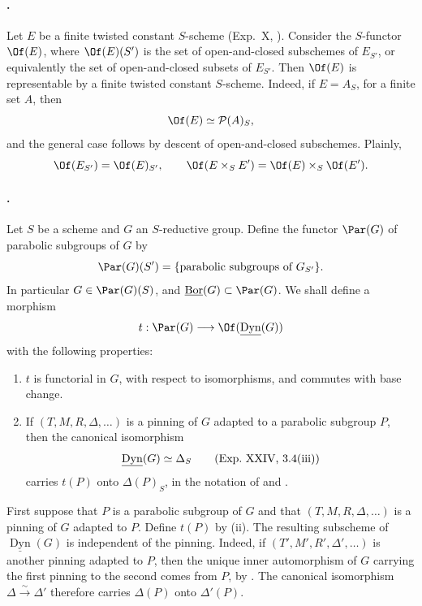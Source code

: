 
\paragraph{.}
Let \(E\) be a finite twisted constant \(S\)-scheme (Exp.\ X, ).
Consider the \(S\)-functor \(\Of(E)\), where \(\Of(E)(S')\) is the set of
open-and-closed subschemes of \(E_{S'}\), or equivalently the set of
open-and-closed subsets of \(E_{S'}\).  Then \(\Of(E)\) is representable
by a finite twisted constant \(S\)-scheme.  Indeed, if \(E=A_S\), for a
finite set \(A\), then
\[
 \Of(E)\simeq\mathcal P(A)_S,
\]
and the general case follows by descent of open-and-closed subschemes.  Plainly,
\[
 \Of(E_{S'})=\Of(E)_{S'},
 \qquad
 \Of(E\times_SE')=\Of(E)\times_S\Of(E').
\]

\paragraph{.}
Let \(S\) be a scheme and \(G\) an \(S\)-reductive group.  Define the
functor \(\Par(G)\) of parabolic subgroups of \(G\) by
\[
 \Par(G)(S')
 =\{\text{parabolic subgroups of }G_{S'}\}.
\]
In particular \(G\in\Par(G)(S)\), and
\(\underline{\operatorname{Bor}}(G)\subset\Par(G)\).  We shall define a
morphism
\[
 t:\Par(G)\longrightarrow\Of(\underline{\operatorname{Dyn}}(G))
\]
with the following properties:
\begin{enumerate}[label=\textup{(\roman*)}]
\item \(t\) is functorial in \(G\), with respect to isomorphisms, and
commutes with base change.
\item If \((T,M,R,\Delta,\ldots)\) is a pinning of \(G\) adapted to a
parabolic subgroup \(P\), then the canonical isomorphism
\[
 \underline{\operatorname{Dyn}}(G)\simeq\Delta_S
\qquad\textup{(Exp.\ XXIV, 3.4(iii))}
\]
carries \(t(P)\) onto \(\Delta(P)_S\), in the notation of  and .
\end{enumerate}

First suppose that \(P\) is a parabolic subgroup of \(G\) and that
\((T,M,R,\Delta,\ldots)\) is a pinning of \(G\) adapted to \(P\).  Define
\(t(P)\) by (ii).  The resulting subscheme of
\(\underline{\operatorname{Dyn}}(G)\) is independent of the pinning.
Indeed, if \((T',M',R',\Delta',\ldots)\) is another pinning adapted to
\(P\), then the unique inner automorphism of \(G\) carrying the first
pinning to the second comes from \(P\), by .  The canonical
isomorphism \(\Delta\xrightarrow{\sim}\Delta'\) therefore carries
\(\Delta(P)\) onto \(\Delta'(P)\).

